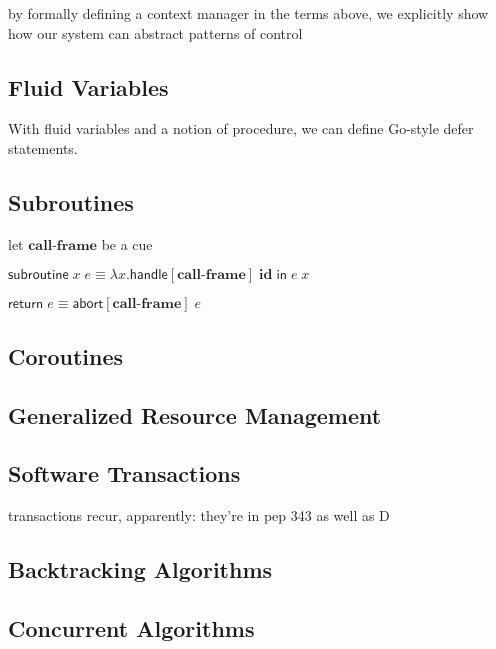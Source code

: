 \documentclass[11pt]{article}
\newcommand{\Cue}{\textbf{Cue}}
\newcommand{\handle}[3]{\textsf{handle}[#1]\;#2\;\textsf{in}\;#3}
\newcommand{\abort}[2]{\textsf{abort}[#1]\;#2}
\begin{document}
by formally defining a context manager in the terms above, we explicitly show how our system can abstract patterns of control


\subsection{Fluid Variables}
With fluid variables and a notion of procedure, we can define Go-style defer statements.

\subsection{Subroutines}

let $\textbf{call-frame}$ be a cue

$\textsf{subroutine}\;x\;e \equiv \lambda x.\handle{\textbf{call-frame}}{\textbf{id}}{e\;x}$

$\textsf{return}\;e \equiv \abort{\textbf{call-frame}}{e}$



\subsection{Coroutines}



\subsection{Generalized Resource Management}
\subsection{Software Transactions}

transactions recur, apparently: they're in pep 343 as well as D

\subsection{Backtracking Algorithms}
\subsection{Concurrent Algorithms}
\end{document}
